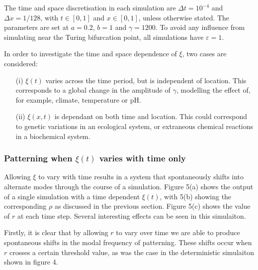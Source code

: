 \documentclass[12pt]{article}
\begin{document}
The time and space discretisation in each simulation are $\Delta t = 10^{-4}$ and $\Delta x = 1/128$, with $t \in [0,1]$ and $x \in [0,1]$, unless otherwise stated. The parameters are set at $a = 0.2$, $b = 1$ and $\gamma = 1200$. To avoid any influence from simulating near the Turing bifurcation point, all simulations have $\varepsilon = 1$. 

In order to investigate the time and space dependence of $\xi$, two cases are considered: 
\begin{enumerate}

    \item [(i)] $\xi(t)$ varies across the time period, but is independent of location. This corresponds to a global change in the amplitude of $\gamma$, modelling the effect of, for example, climate, temperature or pH. 
    \item[(ii)] $\xi(x,t)$ is dependant on both time and location. This could correspond to genetic variations in an ecological system, or extraneous chemical reactions in a biochemical system.  
\end{enumerate}

\subsubsection{Patterning when $\xi(t)$ varies with time only}
Allowing $\xi$ to vary with time results in a system that spontaneously shifts into alternate modes through the course of a simulation. Figure 5(a) shows the output of a single simulation with a time dependent $\xi(t)$, with 5(b) showing the corresponding $\rho$ as discussed in the previous section. Figure 5(c) shows the value of $r$ at each time step. Several interesting effects can be seen in this simulaiton. 

Firstly, it is clear that by allowing $r$ to vary over time we are able to produce spontaneous shifts in the modal frequency of patterning. These shifts occur when $r$ crosses a certain threshold value, as was the case in the deterministic simulaiton shown in figure 4.   
\end{document}
